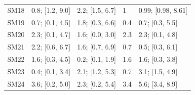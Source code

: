 \documentclass[9pt,lineno,final]{elife}
\begin{document}
\begin{tabular}{lllll}
SM18     &   0.8; [1.2, 9.0] &     2.2; [1.5, 6.7] &                1 &  0.99; [0.98, 8.61] \\
SM19     &   0.7; [0.1, 4.5] &     1.8; [0.3, 6.6] &              0.4 &     0.7; [0.3, 5.5] \\
SM20     &   2.3; [0.1, 4.7] &     1.6; [0.0, 3.0] &              2.3 &     2.3; [0.1, 4.8] \\
SM21     &   2.2; [0.6, 6.7] &     1.6; [0.7, 6.9] &              0.7 &     0.5; [0.3, 6.1] \\
SM22     &   1.6; [0.3, 4.5] &     0.2; [0.1, 1.9] &              1.6 &     1.6; [0.3, 3.8] \\
SM23     &   0.4; [0.1, 3.4] &     2.1; [1.2, 5.3] &              0.7 &     3.1; [1.5, 4.9] \\
SM24     &   3.6; [0.2, 5.0] &     2.3; [0.2, 5.4] &              3.4 &     5.6; [3.4, 8.9] \\
\bottomrule
\end{tabular}

		
		
\end{document}
